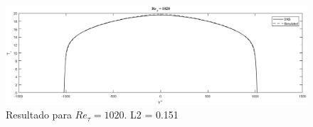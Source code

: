 \documentclass[xcolor=dvipsnames,10pt,aspectratio=169]{beamer}
\begin{document}
\begin{frame}
\begin{minipage}[h!]{0.45\textwidth}
\begin{figure}
				\centering
				\includegraphics[angle=0, scale=0.22]{1020segundo}
				\caption{Resultado para $Re_\tau = 1020$. L2 = 0.151}
			\end{figure}
		\end{minipage}		
		\end{frame}	
	
	
	
	
		
\end{document}
